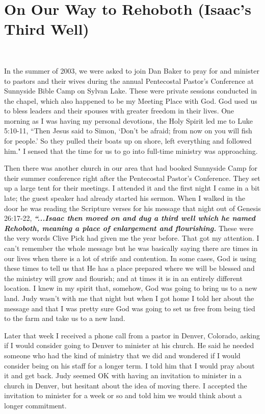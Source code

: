 \documentclass[oneside,12pt]{book}
\begin{document}
\section{On Our Way to Rehoboth (Isaac's Third Well)}
\

In the summer of 2003, we were asked to join Dan Baker to pray for and minister to pastors and their wives during the annual Pentecostal Pastor's Conference at Sunnyside Bible Camp on Sylvan Lake. These were private sessions conducted in the chapel, which also happened to be my Meeting Place with God. God used us to bless leaders and their spouses with greater freedom in their lives. One morning as I was having my personal devotions, the Holy Spirit led me to Luke 5:10-11, ``Then Jesus said to Simon, `Don't be afraid; from now on you will fish for people.' So they pulled their boats up on shore, left everything and followed him." I sensed that the time for us to go into full-time ministry was approaching. 

Then there was another church in our area that had booked Sunnyside Camp for their summer conference right after the Pentecostal Pastor's Conference. They set up a large tent for their meetings. I attended it and the first night I came in a bit late; the guest speaker had already started his sermon. When I walked in the door he was reading the Scripture verses for his message that night out of Genesis 26:17-22, \textit{\textbf{``...Isaac then moved on and dug a third well which he named Rehoboth, meaning a place of enlargement and flourishing.}} These were the very words Clive Pick had given me the year before. That got my attention. I can't remember the whole message but he was basically saying there are times in our lives when there is a lot of strife and contention. In some cases, God is using these times to tell us that He has a place prepared where we will be blessed and the ministry will grow and flourish; and at times it is in an entirely different location. I knew in my spirit that, somehow, God was going to bring us to a new land. Judy wasn't with me that night but when I got home I told her about the message and that I was pretty sure God was going to set us free from being tied to the farm and take us to a new land. 

Later that week I received a phone call from a pastor in Denver, Colorado, asking if I would consider going to Denver to minister at his church. He said he needed someone who had the kind of ministry that we did and wondered if I would consider being on his staff for a longer term. I told him that I would  pray about it and get back. Judy seemed OK with having an invitation to minister in a church in Denver, but hesitant about the idea of moving there. I accepted the invitation to minister for a week or so and told him we would think about a longer commitment.
\end{document}
